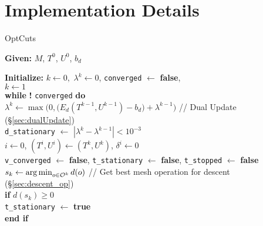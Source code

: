 
\section{Implementation Details}
\label{sec:imp}

\begin{algorithm}[h!]
\label{alg:OptCuts}
\caption{OptCuts}

\textbf{Given:} $M$, $T^0$, $U^0$, $b_d$ 

\textbf{Initialize:} $k \leftarrow 0,$ \hspace{2pt} $\lambda^k \leftarrow 0$, \texttt{converged} $\leftarrow$ \textbf{false}, \\

$k \leftarrow 1$ \\

\textbf{while} \hspace{2pt} \textbf{!}  \texttt{converged} \hspace{2pt} \textbf{do} \\


\hspace{10pt} $\lambda^{k} \leftarrow \max\big(0,\big( E_{d}(T^{k-1}, U^{k-1}) -b_d \big) + \lambda^{k-1}\big)$ \hspace{10pt} // Dual Update (\S\ref{sec:dualUpdate})\\
\hspace{10pt} \texttt{d\_stationary} $\leftarrow$ $| \lambda^{k} - \lambda^{k-1} | < 10^{-3}$ \\

\hspace{10pt} $i \leftarrow 0$, $(T^{i},U^{i}) \leftarrow (T^{k},U^{k})$, \hspace{2pt} $\delta^{i} \leftarrow 0$ \\
\hspace{10pt} \texttt{v\_converged} $\leftarrow$ \textbf{false}, \texttt{t\_stationary} $\leftarrow$ \textbf{false}, \texttt{t\_stopped} $\leftarrow$ \textbf{false} \\
\hspace{10pt} $s_k \leftarrow \operatorname*{arg\,min}_{o \in \mathcal{O}^k} d(o)$ \hspace{10pt}//  Get best mesh operation for descent (\S\ref{sec:descent_op})\\

\hspace{10pt} \textbf{if} $d(s_k) \geq 0$ \\
\hspace{20pt} \texttt{t\_stationary} $\leftarrow$ \textbf{true}\\
\hspace{10pt} \textbf{end if} \\


\end{algorithm}

